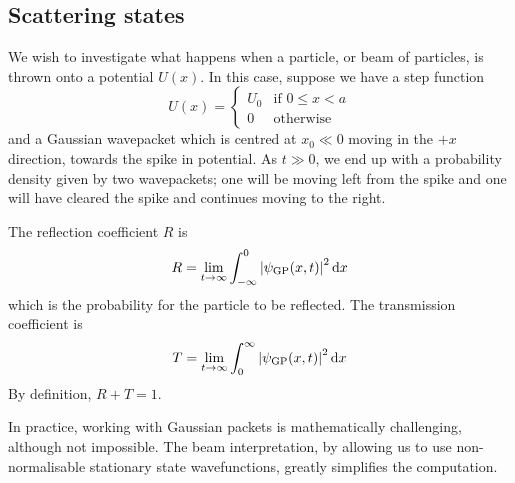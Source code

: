 \subsection{Scattering states}
We wish to investigate what happens when a particle, or beam of particles, is thrown onto a potential \( U(x) \).
In this case, suppose we have a step function
\[
	U(x) = \begin{cases} U_0 & \text{if } 0 \leq x < a \\
              0   & \text{otherwise}\end{cases}
\]
and a Gaussian wavepacket which is centred at \( x_0 \ll 0 \) moving in the \( +x \) direction, towards the spike in potential.
As \( t \gg 0 \), we end up with a probability density given by two wavepackets; one will be moving left from the spike and one will have cleared the spike and continues moving to the right.
\begin{definition}
	The reflection coefficient \( R \) is
	\[
		R = \lim_{t \to \infty} \int_{-\infty}^0 \abs{\psi_{\text{GP}}(x,t)}^2 \dd{x}
	\]
	which is the probability for the particle to be reflected.
	The transmission coefficient is
	\[
		T = \lim_{t \to \infty} \int_0^\infty \abs{\psi_{\text{GP}}(x,t)}^2 \dd{x}
	\]
	By definition, \( R + T = 1 \).
\end{definition}
In practice, working with Gaussian packets is mathematically challenging, although not impossible.
The beam interpretation, by allowing us to use non-normalisable stationary state wavefunctions, greatly simplifies the computation.

